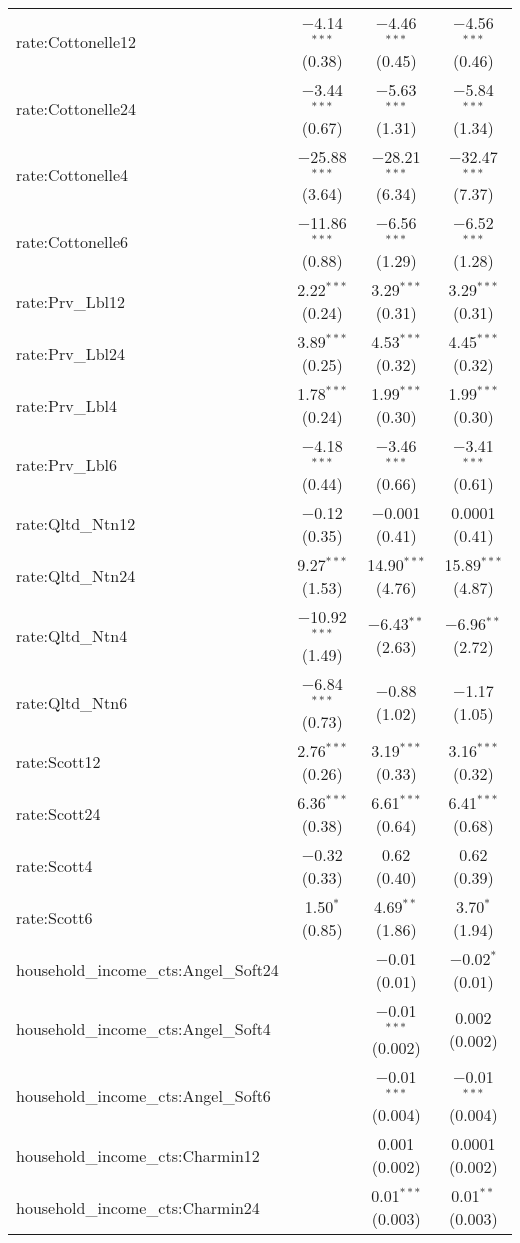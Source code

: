 \begin{table}[!htbp]
\begin{tabular}{@{\extracolsep{5pt}}lccc}
  rate:Cottonelle12 & $-$4.14$^{***}$ (0.38) & $-$4.46$^{***}$ (0.45) & $-$4.56$^{***}$ (0.46) \\ 
  rate:Cottonelle24 & $-$3.44$^{***}$ (0.67) & $-$5.63$^{***}$ (1.31) & $-$5.84$^{***}$ (1.34) \\ 
  rate:Cottonelle4 & $-$25.88$^{***}$ (3.64) & $-$28.21$^{***}$ (6.34) & $-$32.47$^{***}$ (7.37) \\ 
  rate:Cottonelle6 & $-$11.86$^{***}$ (0.88) & $-$6.56$^{***}$ (1.29) & $-$6.52$^{***}$ (1.28) \\ 
  rate:Prv\_Lbl12 & 2.22$^{***}$ (0.24) & 3.29$^{***}$ (0.31) & 3.29$^{***}$ (0.31) \\ 
  rate:Prv\_Lbl24 & 3.89$^{***}$ (0.25) & 4.53$^{***}$ (0.32) & 4.45$^{***}$ (0.32) \\ 
  rate:Prv\_Lbl4 & 1.78$^{***}$ (0.24) & 1.99$^{***}$ (0.30) & 1.99$^{***}$ (0.30) \\ 
  rate:Prv\_Lbl6 & $-$4.18$^{***}$ (0.44) & $-$3.46$^{***}$ (0.66) & $-$3.41$^{***}$ (0.61) \\ 
  rate:Qltd\_Ntn12 & $-$0.12 (0.35) & $-$0.001 (0.41) & 0.0001 (0.41) \\ 
  rate:Qltd\_Ntn24 & 9.27$^{***}$ (1.53) & 14.90$^{***}$ (4.76) & 15.89$^{***}$ (4.87) \\ 
  rate:Qltd\_Ntn4 & $-$10.92$^{***}$ (1.49) & $-$6.43$^{**}$ (2.63) & $-$6.96$^{**}$ (2.72) \\ 
  rate:Qltd\_Ntn6 & $-$6.84$^{***}$ (0.73) & $-$0.88 (1.02) & $-$1.17 (1.05) \\ 
  rate:Scott12 & 2.76$^{***}$ (0.26) & 3.19$^{***}$ (0.33) & 3.16$^{***}$ (0.32) \\ 
  rate:Scott24 & 6.36$^{***}$ (0.38) & 6.61$^{***}$ (0.64) & 6.41$^{***}$ (0.68) \\ 
  rate:Scott4 & $-$0.32 (0.33) & 0.62 (0.40) & 0.62 (0.39) \\ 
  rate:Scott6 & 1.50$^{*}$ (0.85) & 4.69$^{**}$ (1.86) & 3.70$^{*}$ (1.94) \\ 
  household\_income\_cts:Angel\_Soft24 &  & $-$0.01 (0.01) & $-$0.02$^{*}$ (0.01) \\ 
  household\_income\_cts:Angel\_Soft4 &  & $-$0.01$^{***}$ (0.002) & 0.002 (0.002) \\ 
  household\_income\_cts:Angel\_Soft6 &  & $-$0.01$^{***}$ (0.004) & $-$0.01$^{***}$ (0.004) \\ 
  household\_income\_cts:Charmin12 &  & 0.001 (0.002) & 0.0001 (0.002) \\ 
  household\_income\_cts:Charmin24 &  & 0.01$^{***}$ (0.003) & 0.01$^{**}$ (0.003) \\ 

\end{tabular}
\end{table}
